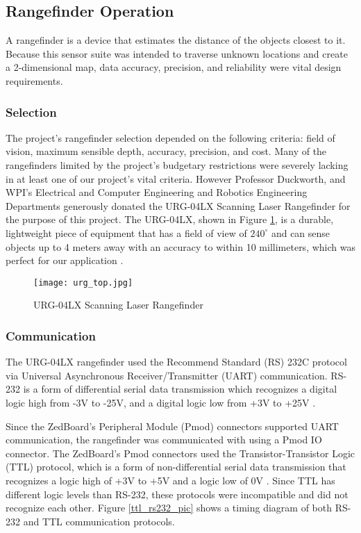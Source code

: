 \subsection{Rangefinder Operation}
A rangefinder is a device that estimates the distance of the objects closest to it. Because this sensor suite was intended to traverse unknown locations and create a 2-dimensional map, data accuracy, precision, and reliability were vital design requirements.

\subsubsection{Selection}
The project's rangefinder selection depended on the following criteria: field of vision, maximum sensible depth, accuracy, precision, and cost. Many of the rangefinders limited by the project's budgetary restrictions were severely lacking in at least one of our project's vital criteria. However Professor Duckworth, and WPI's Electrical and Computer Engineering and Robotics Engineering Departments generously donated the URG-04LX Scanning Laser Rangefinder for the purpose of this project. The URG-04LX, shown in Figure \ref{rangefinder_pic}, is a durable, lightweight piece of equipment that has a field of view of $240^\circ$ and can sense objects up to 4 meters away with an accuracy to within 10 millimeters, which was perfect for our application \cite{urg04lx_specifications}.

\begin{figure}[H]
	\centerline{\texttt{[image: urg\_top.jpg]}}
	\caption{URG-04LX Scanning Laser Rangefinder \cite{rangefinder_photo}}
	\label{rangefinder_pic}
\end{figure}

\subsubsection{Communication} \label{sssec:rangefinder_communication}
The URG-04LX rangefinder used the Recommend Standard (RS) 232C protocol via Universal Asynchronous Receiver/Transmitter (UART) communication. RS-232 is a form of differential serial data transmission which recognizes a digital logic high from -3V to -25V, and a digital logic low from +3V to +25V \cite{rs232}.
\par
Since the ZedBoard's Peripheral Module (Pmod) connectors supported UART communication, the rangefinder was communicated with using a Pmod IO connector. The ZedBoard's Pmod connectors used the Transistor-Transistor Logic (TTL) protocol, which is a form of non-differential serial data transmission that recognizes a logic high of +3V to +5V and a logic low of 0V \cite{ttl}. Since TTL has different logic levels than RS-232, these protocols were incompatible and did not recognize each other. Figure \ref{ttl_rs232_pic} shows a timing diagram of both RS-232 and TTL communication protocols.

